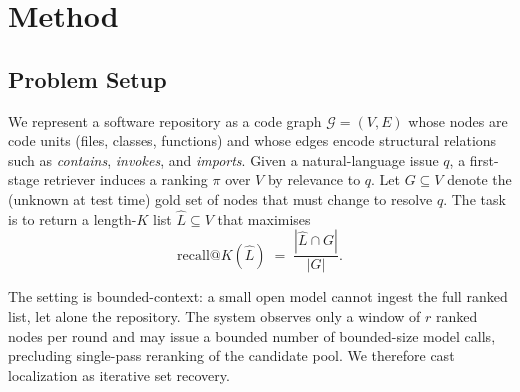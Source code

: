 \section{Method}
\label{sec:method}

%

\subsection{Problem Setup}
\label{sec:setup}

We represent a software repository as a code graph
$\mathcal{G}=(V,E)$ whose nodes are code units (files, classes,
functions) and whose edges encode structural relations such as
\textit{contains}, \textit{invokes}, and \textit{imports}.
Given a natural-language issue $q$, a first-stage retriever
induces a ranking $\pi$ over $V$ by relevance to $q$. Let
$G \subseteq V$ denote the (unknown at test time) gold set of
nodes that must change to resolve $q$. The task is to return a
length-$K$ list $\hat{L} \subseteq V$ that maximises
\begin{equation}
\text{recall}@K(\hat{L}) \;=\; \frac{|\hat{L} \cap G|}{|G|}.
\label{eq:recall}
\end{equation}

The setting is bounded-context: a small open model cannot
ingest the full ranked list, let alone the repository. The
system observes only a window of $r$ ranked nodes per round and
may issue a bounded number of bounded-size model calls,
precluding single-pass reranking of the candidate pool. We
therefore cast localization as iterative set recovery.

